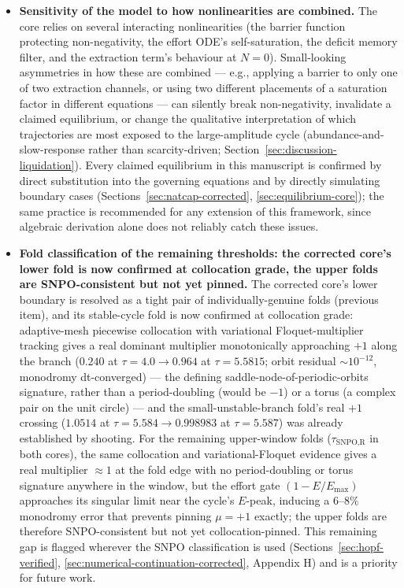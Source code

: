 \documentclass[twocolumn,10pt]{article}
\begin{document}
\begin{itemize}
\item \textbf{Sensitivity of the model to how nonlinearities are combined.} The core relies on several interacting nonlinearities (the barrier function protecting non-negativity, the effort ODE's self-saturation, the deficit memory filter, and the extraction term's behaviour at $N=0$). Small-looking asymmetries in how these are combined — e.g., applying a barrier to only one of two extraction channels, or using two different placements of a saturation factor in different equations — can silently break non-negativity, invalidate a claimed equilibrium, or change the qualitative interpretation of which trajectories are most exposed to the large-amplitude cycle (abundance-and-slow-response rather than scarcity-driven; Section~\ref{sec:discussion-liquidation}). Every claimed equilibrium in this manuscript is confirmed by direct substitution into the governing equations and by directly simulating boundary cases (Sections~\ref{sec:natcap-corrected}, \ref{sec:equilibrium-core}); the same practice is recommended for any extension of this framework, since algebraic derivation alone does not reliably catch these issues.
\item \textbf{Fold classification of the remaining thresholds: the corrected core's lower fold is now confirmed at collocation grade, the upper folds are SNPO-consistent but not yet pinned.} The corrected core's lower boundary is resolved as a tight pair of individually-genuine folds (previous item), and its stable-cycle fold is now confirmed at collocation grade: adaptive-mesh piecewise collocation with variational Floquet-multiplier tracking gives a real dominant multiplier monotonically approaching $+1$ along the branch ($0.240$ at $\tau=4.0\to0.964$ at $\tau=5.5815$; orbit residual ${\sim}10^{-12}$, monodromy dt-converged) --- the defining saddle-node-of-periodic-orbits signature, rather than a period-doubling (would be $-1$) or a torus (a complex pair on the unit circle) --- and the small-unstable-branch fold's real $+1$ crossing ($1.0514$ at $\tau=5.584\to0.998983$ at $\tau=5.587$) was already established by shooting. For the remaining upper-window folds ($\tau_{\text{SNPO,R}}$ in both cores), the same collocation and variational-Floquet evidence gives a real multiplier $\approx1$ at the fold edge with no period-doubling or torus signature anywhere in the window, but the effort gate $(1-E/E_{\max})$ approaches its singular limit near the cycle's $E$-peak, inducing a $6$--$8\%$ monodromy error that prevents pinning $\mu=+1$ exactly; the upper folds are therefore SNPO-consistent but not yet collocation-pinned. This remaining gap is flagged wherever the SNPO classification is used (Sections~\ref{sec:hopf-verified}, \ref{sec:numerical-continuation-corrected}, Appendix H) and is a priority for future work.

\end{itemize}
\end{document}
